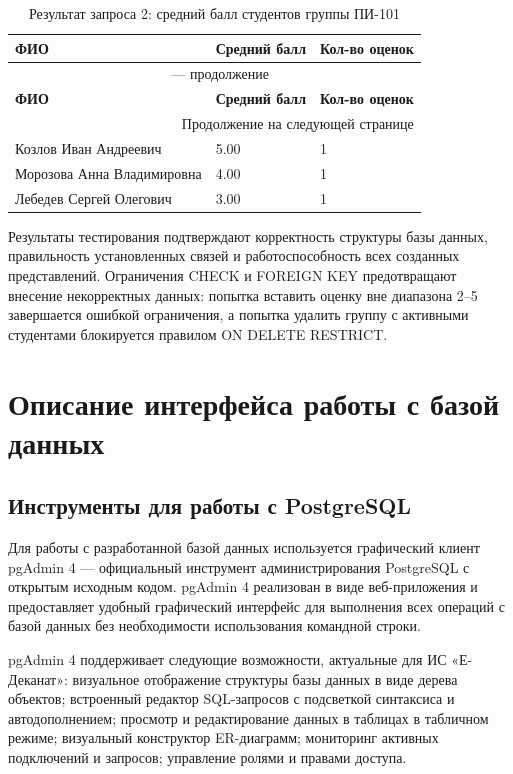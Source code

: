 \documentclass[14pt, a4paper]{extreport}
\begin{document}
\begin{longtable}{p{6cm} p{3cm} p{3cm}}
\caption{Результат запроса 2: средний балл студентов группы ПИ-101} \\
\toprule
\textbf{ФИО} & \textbf{Средний балл} & \textbf{Кол-во оценок} \\
\midrule
\endfirsthead
\multicolumn{3}{c}{{\tablename\ \thetable{} --- продолжение}} \\
\toprule
\textbf{ФИО} & \textbf{Средний балл} & \textbf{Кол-во оценок} \\
\midrule
\endhead
\midrule
\multicolumn{3}{r}{{Продолжение на следующей странице}} \\
\endfoot
\bottomrule
\endlastfoot
Козлов Иван Андреевич & 5.00 & 1 \\
Морозова Анна Владимировна & 4.00 & 1 \\
Лебедев Сергей Олегович & 3.00 & 1 \\
\end{longtable}

Результаты тестирования подтверждают корректность структуры базы данных, правильность установленных связей и работоспособность всех созданных представлений. Ограничения CHECK и FOREIGN KEY предотвращают внесение некорректных данных: попытка вставить оценку вне диапазона 2--5 завершается ошибкой ограничения, а попытка удалить группу с активными студентами блокируется правилом ON DELETE RESTRICT.

\section{Описание интерфейса работы с базой данных}

\subsection{Инструменты для работы с PostgreSQL}
Для работы с разработанной базой данных используется графический клиент pgAdmin 4 --- официальный инструмент администрирования PostgreSQL с открытым исходным кодом. pgAdmin 4 реализован в виде веб-приложения и предоставляет удобный графический интерфейс для выполнения всех операций с базой данных без необходимости использования командной строки.

pgAdmin 4 поддерживает следующие возможности, актуальные для ИС «Е-Деканат»: визуальное отображение структуры базы данных в виде дерева объектов; встроенный редактор SQL-запросов с подсветкой синтаксиса и автодополнением; просмотр и редактирование данных в таблицах в табличном режиме; визуальный конструктор ER-диаграмм; мониторинг активных подключений и запросов; управление ролями и правами доступа.
\end{document}

